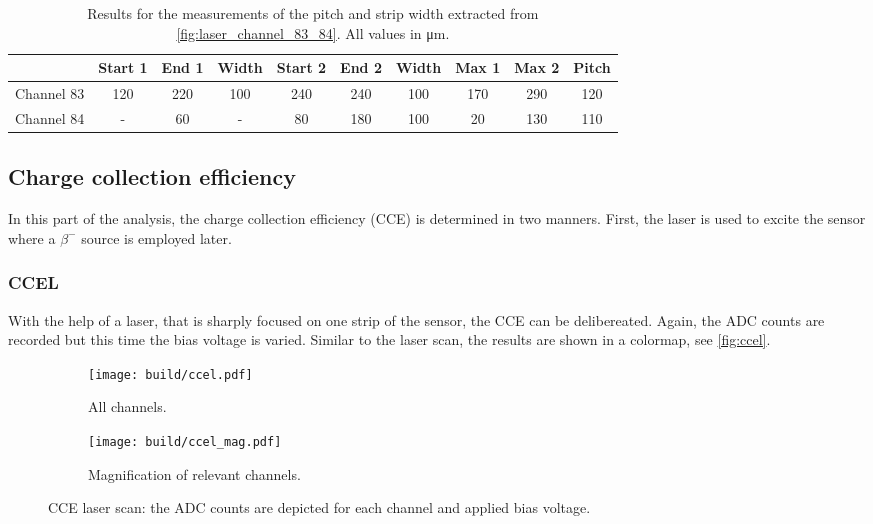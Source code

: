 \begin{table}
    \centering
    \caption{Results for the measurements of the pitch and strip width extracted from \autoref{fig:laser_channel_83_84}. All values in \unit{\micro\metre}.}
    \label{tab:pitch_width}
    \begin{tabular}{l | c c | c || c c | c || c c | c}
      \toprule
      {} & {Start 1} & {End 1} & {Width} & {Start 2} & {End 2} & {Width} & {Max 1} & {Max 2} & {Pitch} \\
      \midrule
      {Channel 83} & 120 & 220 & 100    & 240 & 240 & 100   & 170 & 290 & 120 \\ 
      {Channel 84} &  -  &  60 &  -     &  80 & 180 & 100   &  20 & 130 & 110 \\
      \bottomrule
    \end{tabular}
  \end{table}


\subsection{Charge collection efficiency}
In this part of the analysis, the charge collection efficiency (CCE) is determined in two manners. First, the laser is used to excite the sensor where a $\beta^-$ 
source is employed later.

\subsubsection{CCEL}
With the help of a laser, that is sharply focused on one strip of the sensor, the CCE can be delibereated. Again, the ADC counts are recorded but this time the
bias voltage is varied. Similar to the laser scan, the results are shown in a colormap, see \autoref{fig:ccel}.
\begin{figure}
    \centering
    \begin{subfigure}{0.49\textwidth}
        \texttt{[image: build/ccel.pdf]}
        \caption{All channels.}
        \label{fig:ccel_all_channels}
    \end{subfigure}
    \hfill
    \begin{subfigure}{0.49\textwidth}
        \texttt{[image: build/ccel\_mag.pdf]}
        \caption{Magnification of relevant channels.}
        \label{fig:ccel_mag}
    \end{subfigure}
    \caption{CCE laser scan: the ADC counts are depicted for each channel and applied bias voltage.}
    \label{fig:ccel}
\end{figure}

